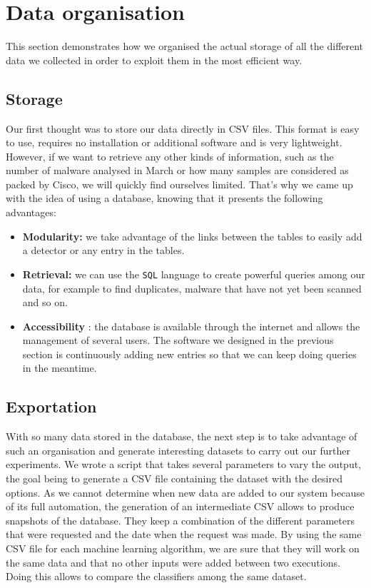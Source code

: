 \section{Data organisation} \label{gt}
This section demonstrates how we organised the actual storage of all the different data we collected in order to exploit them in the most efficient way.

\subsection{Storage}
Our first thought was to store our data directly in CSV files. This format is easy to use, requires no installation or additional software and is very lightweight. However, if we want to retrieve any other kinds of information, such as the number of malware analysed in March or how many samples are considered as packed by Cisco, we will quickly find ourselves limited. That's why we came up with the idea of using a database, knowing that it presents the following advantages:

\begin{itemize}
    \item \textbf{Modularity:} we take advantage of the links between the tables to easily add a detector or any entry in the tables.
    \item \textbf{Retrieval:} we can use the \texttt{SQL} language to create powerful queries among our data, for example to find duplicates, malware that have not yet been scanned and so on.
    \item \textbf{Accessibility} : the database is available through the internet and allows the management of several users. The software we designed in the previous section is continuously adding new entries so that we can keep doing queries in the meantime.
\end{itemize}

\subsection{Exportation}

With so many data stored in the database, the next step is to take advantage of such an organisation and generate interesting datasets to carry out our further experiments. We wrote a script that takes several parameters to vary the output, the goal being to generate a CSV file containing the dataset with the desired options. As we cannot determine when new data are added to our system because of its full automation, the generation of an intermediate CSV allows to produce snapshots of the database. They keep a combination of the different parameters that were requested and the date when the request was made. By using the same CSV file for each machine learning algorithm, we are sure that they will work on the same data and that no other inputs were added between two executions. Doing this allows to compare the classifiers among the same dataset. 

